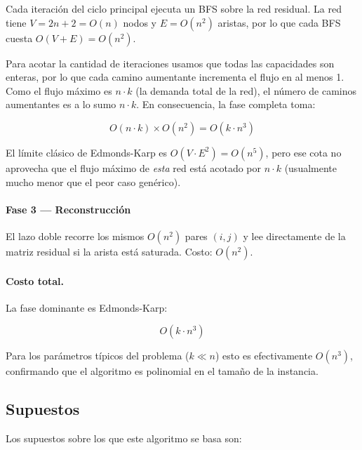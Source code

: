 Cada iteración del ciclo principal ejecuta un BFS sobre la red residual.
La red tiene $V = 2n+2 = O(n)$ nodos y $E = O(n^2)$ aristas, por lo que
cada BFS cuesta $O(V + E) = O(n^2)$.

Para acotar la cantidad de iteraciones usamos que todas las capacidades son
enteras, por lo que cada camino aumentante incrementa el flujo en al menos 1.
Como el flujo máximo es $n \cdot k$ (la demanda total de la red), el número de
caminos aumentantes es a lo sumo $n \cdot k$. En consecuencia, la fase completa
toma:

\begin{equation*}
O(n \cdot k) \times O(n^2) = O(k \cdot n^3)
\end{equation*}

El límite clásico de Edmonds-Karp es $O(V \cdot E^2) = O(n^5)$, pero ese cota
no aprovecha que el flujo máximo de \emph{esta} red está acotado por $n \cdot k$
(usualmente mucho menor que el peor caso genérico).

\paragraph{Fase 3 — Reconstrucción }

El lazo doble recorre los mismos $O(n^2)$ pares $(i,j)$ y lee directamente
de la matriz residual si la arista está saturada. Costo: $O(n^2)$.

\paragraph{Costo total.}

La fase dominante es Edmonds-Karp:

\begin{equation*}
\boxed{O(k \cdot n^3)}
\end{equation*}

Para los parámetros típicos del problema ($k \ll n$) esto es efectivamente
$O(n^3)$, confirmando que el algoritmo es polinomial en el tamaño de la
instancia.

\subsection{Supuestos}
Los supuestos sobre los que este algoritmo se basa son:

